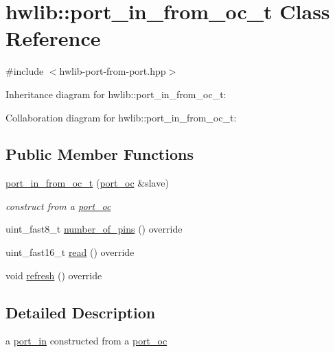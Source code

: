 \hypertarget{classhwlib_1_1port__in__from__oc__t}{}\section{hwlib\+:\+:port\+\_\+in\+\_\+from\+\_\+oc\+\_\+t Class Reference}
\label{classhwlib_1_1port__in__from__oc__t}


{\ttfamily \#include $<$hwlib-\/port-\/from-\/port.\+hpp$>$}



Inheritance diagram for hwlib\+:\+:port\+\_\+in\+\_\+from\+\_\+oc\+\_\+t\+:


Collaboration diagram for hwlib\+:\+:port\+\_\+in\+\_\+from\+\_\+oc\+\_\+t\+:
\subsection*{Public Member Functions}
\begin{DoxyCompactItemize}
\item 
\mbox{\label{classhwlib_1_1port__in__from__oc__t_a944dfda77c799bece8c85780f3367483}} 
\hyperlink{classhwlib_1_1port__in__from__oc__t_a944dfda77c799bece8c85780f3367483}{port\+\_\+in\+\_\+from\+\_\+oc\+\_\+t} (\hyperlink{classhwlib_1_1port__oc}{port\+\_\+oc} \&slave)
\begin{DoxyCompactList}\small\item\em construct from a \hyperlink{classhwlib_1_1port__oc}{port\+\_\+oc} \end{DoxyCompactList}\item 
uint\+\_\+fast8\+\_\+t \hyperlink{classhwlib_1_1port__in__from__oc__t_a1b9fcc42a25a22ee96683c79a5b1b22c}{number\+\_\+of\+\_\+pins} () override
\item 
uint\+\_\+fast16\+\_\+t \hyperlink{classhwlib_1_1port__in__from__oc__t_aaf875d99cf56fb579152a9977652f202}{read} () override
\item 
void \hyperlink{classhwlib_1_1port__in__from__oc__t_a2752b7d3a9e676033ad421b3ca5e903b}{refresh} () override
\end{DoxyCompactItemize}


\subsection{Detailed Description}
a \hyperlink{classhwlib_1_1port__in}{port\+\_\+in} constructed from a \hyperlink{classhwlib_1_1port__oc}{port\+\_\+oc}

